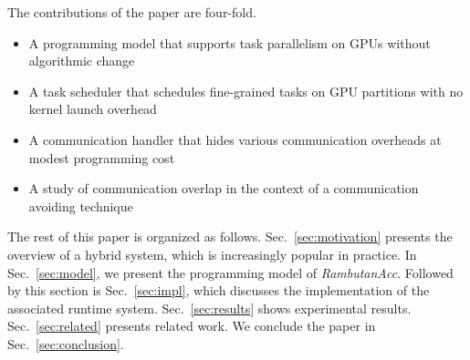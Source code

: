 The contributions of the paper are four-fold.
\begin{itemize}
\item A programming model that supports task parallelism on GPUs without algorithmic change
\item A task scheduler that schedules fine-grained tasks on GPU partitions with no kernel launch overhead
\item A communication handler that hides various communication overheads at modest programming cost
\item A study of communication overlap in the context of a communication avoiding technique
\end{itemize}

The rest of this paper is organized as follows.
Sec.~\ref{sec:motivation} presents the overview of a hybrid system, which is increasingly popular in practice.
In Sec.~\ref{sec:model}, we present the programming model of {\em RambutanAcc}.
Followed by this section is Sec.~\ref{sec:impl}, which discusses the implementation of the associated runtime system.
Sec.~\ref{sec:results} shows experimental results.
Sec.~\ref{sec:related} presents related work.
We conclude the paper in Sec.~\ref{sec:conclusion}.
